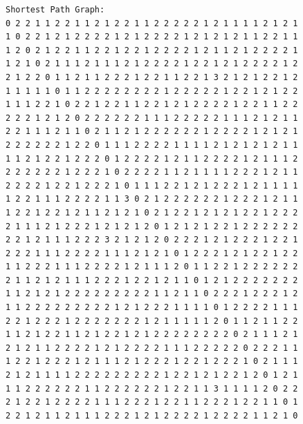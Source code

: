 \documentclass[11pt]{article}
\begin{document}
\begin{lstlisting}
Shortest Path Graph:
0 2 2 1 1 2 2 1 1 2 1 2 2 1 1 2 2 2 2 2 1 2 1 1 1 1 2 1 2 1
1 0 2 2 1 2 1 2 2 2 2 1 2 1 2 2 2 2 1 2 1 2 1 2 1 1 2 2 1 1
1 2 0 2 1 2 2 1 1 2 2 1 2 2 1 2 2 2 2 1 2 1 1 2 1 2 2 2 2 1
1 2 1 0 2 1 1 1 2 1 1 1 2 1 2 2 2 2 1 2 2 1 2 1 2 2 2 2 1 2
2 1 2 2 0 1 1 2 1 1 2 2 2 1 2 2 1 1 2 2 1 3 2 1 2 1 2 2 1 2
1 1 1 1 1 0 1 1 2 2 2 2 2 2 2 2 1 2 2 2 2 2 1 2 2 1 2 1 2 2
1 1 1 2 2 1 0 2 2 1 2 2 1 1 2 2 1 2 1 2 2 2 2 1 2 2 1 1 2 2
2 2 2 1 2 1 2 0 2 2 2 2 2 2 1 1 1 2 2 2 2 2 1 1 1 2 1 2 1 1
2 2 1 1 1 2 1 1 0 2 1 1 2 1 2 2 2 2 2 2 1 2 2 2 2 1 2 1 2 1
2 2 2 2 2 2 1 2 2 0 1 1 1 2 2 2 2 1 1 1 1 2 1 2 1 2 1 2 1 1
1 1 2 1 2 2 1 2 2 2 0 1 2 2 2 2 1 2 1 1 2 2 2 2 1 2 1 1 1 2
2 2 2 2 2 2 1 2 2 2 1 0 2 2 2 2 1 1 2 1 1 1 1 2 2 2 1 2 1 1
2 2 2 2 1 2 2 1 2 2 2 1 0 1 1 1 2 2 1 2 1 2 2 2 1 2 1 1 1 1
1 2 2 1 1 1 2 2 2 2 1 1 3 0 2 1 2 2 2 2 2 2 1 2 2 2 1 2 1 1
1 2 2 1 2 2 1 2 1 1 2 1 2 1 0 2 1 2 2 1 2 1 2 1 2 2 1 2 2 2
2 1 1 1 2 1 2 2 2 1 2 1 2 1 2 0 1 2 1 2 1 2 2 1 2 2 2 2 2 2
2 2 1 2 1 1 1 2 2 2 3 2 1 2 1 2 0 2 2 2 1 2 1 2 2 2 1 2 2 1
2 2 2 1 1 1 2 2 2 2 1 1 1 2 1 2 1 0 1 2 2 2 1 2 1 2 2 1 2 2
1 1 2 2 2 1 1 1 2 2 2 2 1 2 1 1 1 2 0 1 1 2 2 1 2 2 2 2 2 2
2 1 1 2 1 2 1 1 1 2 2 2 1 2 2 1 2 1 1 0 1 2 1 2 2 2 2 2 2 2
1 1 2 1 2 1 2 2 2 2 2 2 2 2 2 1 1 2 1 1 0 2 2 2 1 2 2 2 1 2
1 1 2 2 2 2 2 2 2 2 2 1 2 1 2 2 2 1 1 1 1 0 1 2 2 2 2 1 1 1
2 2 1 2 2 2 1 2 2 2 2 2 2 2 1 2 1 1 1 1 1 2 0 1 1 2 1 1 2 2
1 1 2 1 2 2 1 1 2 1 2 2 1 2 1 2 2 2 2 2 2 2 2 0 2 1 1 1 2 1
2 1 2 1 1 2 2 2 2 1 2 1 2 2 2 2 1 1 1 2 2 2 2 2 0 2 2 2 1 1
1 2 2 1 2 2 2 1 2 1 1 1 2 1 2 2 2 1 2 2 1 2 2 2 1 0 2 1 1 1
2 1 2 1 1 1 1 2 2 2 2 2 2 2 2 2 1 2 2 1 2 1 2 2 1 2 0 1 2 1
1 1 2 2 2 2 2 2 1 1 2 2 2 2 2 2 1 2 2 1 1 3 1 1 1 1 2 0 2 2
2 1 2 2 1 2 2 2 2 1 1 1 2 2 2 1 2 2 1 1 2 2 2 1 2 2 1 1 0 1
2 2 1 2 1 1 2 1 1 1 2 2 2 1 2 1 2 2 2 2 1 2 2 2 2 1 1 2 1 0


\end{lstlisting}
\end{document}
